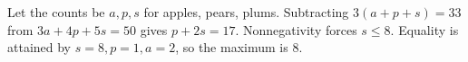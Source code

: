 Let the counts be $a,p,s$ for apples, pears, plums. Subtracting $3(a+p+s)=33$ from $3a+4p+5s=50$ gives $p+2s=17$. Nonnegativity forces $s\le8$. Equality is attained by $s=8,p=1,a=2$, so the maximum is $\boxed8$.
